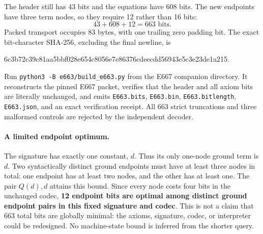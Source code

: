 The header still has 43 bits and the equations have 608 bits.  The new
endpoints have three term nodes, so they require 12 rather than 16 bits:
\[
                       43+608+12=\boxed{663\text{ bits}}.
\]
Packed transport occupies 83 bytes, with one trailing zero padding bit.
The exact bit-character SHA-256, excluding the final newline, is
\begin{center}\scriptsize\ttfamily
6c3b72c39c81aa5bbf028e654c8056e7e86376cdeecdd56943e5c3e23de1a215.
\end{center}
Run \texttt{python3 -B e663/build\_e663.py} from the E667 companion
directory.  It reconstructs the pinned E667 packet, verifies that the
header and all axiom bits are literally unchanged, and emits
\texttt{E663.bits}, \texttt{E663.bin}, \texttt{E663.bitlength},
\texttt{E663.json}, and an exact verification receipt.
All 663 strict truncations and three malformed controls are rejected
by the independent decoder.

\paragraph{A limited endpoint optimum.}
The signature has exactly one constant, $d$.  Thus its only one-node
ground term is $d$.  Two syntactically distinct ground endpoints must
have at least three nodes in total: one endpoint has at least two
nodes, and the other has at least one.  The pair $Q(d),d$ attains this
bound.  Since every node costs four bits in the unchanged codec,
\textbf{12 endpoint bits are optimal among distinct ground endpoint
pairs in this fixed signature and codec}.  This is not a claim that
663 total bits are globally minimal: the axioms, signature, codec,
or interpreter could be redesigned.  No machine-state bound is
inferred from the shorter query.
